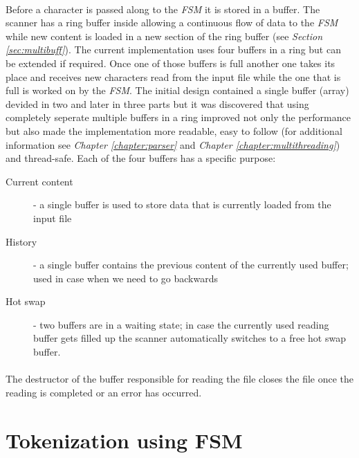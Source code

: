 	\paragraph{}
		Before a character is passed along to the \textit{FSM} it is stored in a buffer. The scanner has a ring buffer inside allowing a continuous flow of data to the \textit{FSM} while new content is loaded in a new section of the ring buffer (see \textit{Section \ref{sec:multibuff}}). The current implementation uses four buffers in a ring but can be extended if required. Once one of those buffers is full another one takes its place and receives new characters read from the input file while the one that is full is worked on by the \textit{FSM}. The initial design contained a single buffer (array) devided in two and later in three parts but it was discovered that using completely seperate multiple buffers in a ring improved not only the performance but also made the implementation more readable, easy to follow (for additional information see \textit{Chapter \ref{chapter:parser}} and \textit{Chapter \ref{chapter:multithreading}}) and thread-safe. Each of the four buffers has a specific purpose:
		\begin{description}
			\item[Current content] - a single buffer is used to store data that is currently loaded from the input file
			\item[History] - a single buffer contains the previous content of the currently used buffer; used in case when we need to go backwards
			\item[Hot swap] - two buffers are in a waiting state; in case the currently used reading buffer gets filled up the scanner automatically switches to a free hot swap buffer.
		\end{description}
		
	\paragraph{}
		The destructor of the buffer responsible for reading the file closes the file once the reading is completed or an error has occurred.
  
	\section{Tokenization using FSM}
  	\label{sec:fsm}
